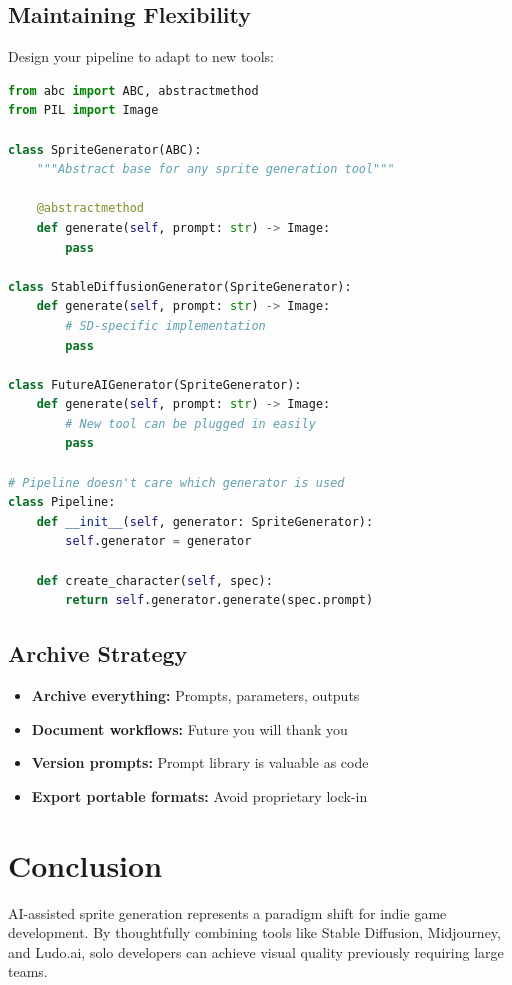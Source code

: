 \documentclass[11pt]{article}
\begin{document}
\subsection{Maintaining Flexibility}

Design your pipeline to adapt to new tools:

\begin{lstlisting}[language=Python, caption={Tool abstraction for future flexibility}]
from abc import ABC, abstractmethod
from PIL import Image

class SpriteGenerator(ABC):
    """Abstract base for any sprite generation tool"""

    @abstractmethod
    def generate(self, prompt: str) -> Image:
        pass

class StableDiffusionGenerator(SpriteGenerator):
    def generate(self, prompt: str) -> Image:
        # SD-specific implementation
        pass

class FutureAIGenerator(SpriteGenerator):
    def generate(self, prompt: str) -> Image:
        # New tool can be plugged in easily
        pass

# Pipeline doesn't care which generator is used
class Pipeline:
    def __init__(self, generator: SpriteGenerator):
        self.generator = generator

    def create_character(self, spec):
        return self.generator.generate(spec.prompt)
\end{lstlisting}

\subsection{Archive Strategy}

\begin{itemize}
    \item \textbf{Archive everything:} Prompts, parameters, outputs
    \item \textbf{Document workflows:} Future you will thank you
    \item \textbf{Version prompts:} Prompt library is valuable as code
    \item \textbf{Export portable formats:} Avoid proprietary lock-in
\end{itemize}

\section{Conclusion}

AI-assisted sprite generation represents a paradigm shift for indie game development. By thoughtfully combining tools like Stable Diffusion, Midjourney, and Ludo.ai, solo developers can achieve visual quality previously requiring large teams.
\end{document}
